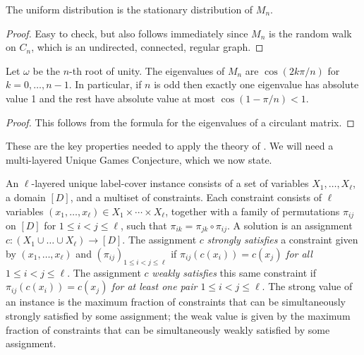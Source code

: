 \documentclass[a4paper,11pt, DIV=11]{scrartcl}
\theoremstyle{plain}
\theoremstyle{definition}
\begin{document}
\begin{lemma}
    The uniform distribution is the stationary distribution of $M_{n}$.
\end{lemma}
\begin{proof}
    Easy to check, but also follows immediately since $M_{n}$ is the random walk on $C_{n}$, which is an undirected, connected, regular graph.
\end{proof}

\begin{lemma}
    Let $\omega$ be the $n$-th root of unity. The eigenvalues of $M_{n}$ are $\cos(2k\pi / n)$ for $k = 0, \ldots, n - 1$. In particular, if $n$ is odd then exactly one eigenvalue has absolute value 1 and the rest have absolute value at most $\cos(1 - \pi/n) < 1$.\footnotemark
\end{lemma}
\begin{proof}
    This follows from the formula for the eigenvalues of a circulant matrix.
\end{proof}

These are the key properties needed to apply the theory of \cite{Dinur09:sicomp}. We will need a multi-layered Unique Games Conjecture, which we now state.

\begin{definition}\label{def:layered}
    An $\ell$-layered unique label-cover instance consists of a set of variables
    $X_1, \ldots, X_\ell$, a domain $[D]$, and a multiset of constraints. Each
    constraint consists of $\ell$ variables $(x_1, \ldots, x_\ell) \in X_1
    \times \cdots \times X_\ell$, together with a family of permutations
    $\pi_{ij}$ on $[D]$ for $1 \leq i < j \leq \ell$, such that $\pi_{ik} =
    \pi_{jk} \circ \pi_{ij}$. A solution is an assignment $c : (X_1  \cup \ldots
    \cup X_\ell) \to [D]$. The assignment $c$ \emph{strongly satisfies} a
    constraint given by $(x_1, \ldots, x_{\ell})$ and $(\pi_{ij})_{1 \leq i < j
    \leq \ell}$ if $\pi_{ij}(c(x_i)) = c(x_j)$ \emph{for all $1 \leq i < j \leq
    \ell$}. The assignment $c$ \emph{weakly satisfies} this same constraint if
    $\pi_{ij}(c(x_i)) = c(x_j)$ \emph{for at least one pair $1 \leq i < j \leq
    \ell$}. The strong value of an instance is the maximum fraction of
    constraints that can be simultaneously strongly satisfied by some
    assignment; the weak value is given by the maximum fraction of constraints
    that can be simultaneously weakly satisfied by some assignment.
\end{definition}
\end{document}
